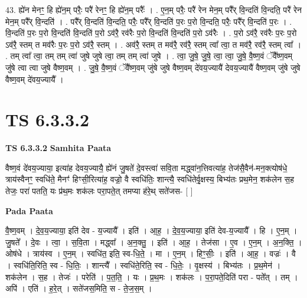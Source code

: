 \documentclass[17pt]{extarticle}
\begin{document}
43. ह्ये॑न मेनꣳ॒॒ हि ह्ये॑न॒म् परैः॒ परै॑ रेनꣳ॒॒ हि ह्ये॑न॒म् परैः᳚ । . ए॒न॒म् परैः॒ परै॑ रेन मेन॒म् परै᳚र् वि॒न्दति॑ वि॒न्दति॒ परै॑ रेन मेन॒म् परै᳚र् वि॒न्दति॑ । . परै᳚र् वि॒न्दति॑ वि॒न्दति॒ परैः॒ परै᳚र् वि॒न्दति॑ प॒रः प॒रो वि॒न्दति॒ परैः॒ परै᳚र् वि॒न्दति॑ प॒रः । . वि॒न्दति॑ प॒रः प॒रो वि॒न्दति॑ वि॒न्दति॑ प॒रो ऽव॑रै॒ रव॑रैः प॒रो वि॒न्दति॑ वि॒न्दति॑ प॒रो ऽव॑रैः । . प॒रो ऽव॑रै॒ रव॑रैः प॒रः प॒रो ऽव॑रै॒ स्तम् त मव॑रैः प॒रः प॒रो ऽव॑रै॒ स्तम् । . अव॑रै॒ स्तम् त मव॑रै॒ रव॑रै॒ स्तम् त्वा᳚ त्वा॒ त मव॑रै॒ रव॑रै॒ स्तम् त्वा᳚ । . तम् त्वा᳚ त्वा॒ तम् तम् त्वा॑ जुषे जुषे त्वा॒ तम् तम् त्वा॑ जुषे । . त्वा॒ जु॒षे॒ जु॒षे॒ त्वा॒ त्वा॒ जु॒षे॒ वै॒ष्ण॒वं ॅवै᳚ष्ण॒वम् जु॑षे त्वा त्वा जुषे वैष्ण॒वम् । . जु॒षे॒ वै॒ष्ण॒वं ॅवै᳚ष्ण॒वम् जु॑षे जुषे वैष्ण॒वम् दे॑वय॒ज्यायै॑ देवय॒ज्यायै॑ वैष्ण॒वम् जु॑षे जुषे वैष्ण॒वम् दे॑वय॒ज्यायै᳚ । \newline
\pagebreak
{}

\section{ TS 6.3.3.2 }

\textbf{TS 6.3.3.2 } \newline
\textbf{Samhita Paata} \newline

वैष्ण॒वं दे॑वय॒ज्याया॒ इत्या॑ह देवय॒ज्यायै॒ ह्ये॑नं जु॒षते॑ दे॒वस्त्वा॑ सवि॒ता मद्ध्वा॑न॒त्तिवत्या॑ह॒ तेज॑सै॒वैन॑-मन॒क्त्योष॑धे॒ त्राय॑स्वैनꣳ॒॒ स्वधि॑ते॒ मैनꣳ॑ हिꣳसी॒रित्या॑ह॒ वज्रो॒ वै स्वधि॑तिः॒ शान्त्यै॒ स्वधि॑तेर्वृ॒क्षस्य॒ बिभ्य॑तः प्रथ॒मेन॒ शक॑लेन स॒ह तेजः॒ परा॑ पतति॒ यः प्र॑थ॒मः शक॑लः परा॒पते॒त् तमप्या ह॑रे॒थ् सते॑जस- [  ] \newline

\textbf{Pada Paata} \newline

वै॒ष्ण॒वम् । दे॒व॒य॒ज्याया॒ इति॑ देव - य॒ज्यायै᳚ । इति॑ । आ॒ह॒ । दे॒व॒य॒ज्याया॒ इति॑ देव-य॒ज्यायै᳚ । हि । ए॒न॒म् । जु॒षते᳚ । दे॒वः । त्वा॒ । स॒वि॒ता । मद्ध्वा᳚ । अ॒न॒क्तु॒ । इति॑ । आ॒ह॒ । तेज॑सा । ए॒व । ए॒न॒म् । अ॒न॒क्ति॒ । ओष॑धे । त्राय॑स्व । ए॒न॒म् । स्वधि॑त॒ इति॒ स्व-धि॒ते॒ । मा । ए॒न॒म् । हिꣳ॒॒सीः॒ । इति॑ । आ॒ह॒ । वज्रः॑ । वै । स्वधि॑ति॒रिति॒ स्व - धि॒तिः॒ । शान्त्यै᳚ । स्वधि॑ते॒रिति॒ स्व - धि॒तेः॒ । वृ॒क्षस्य॑ । बिभ्य॑तः । प्र॒थ॒मेन॑ । शक॑लेन । स॒ह । तेजः॑ । परेति॑ । प॒त॒ति॒ । यः । प्र॒थ॒मः । शक॑लः । प॒रा॒पते॒दिति॑ परा - पते᳚त् । तम् । अपि॑ । एति॑ । ह॒रे॒त् । सते॑जस॒मिति॒ स - ते॒ज॒स॒म् ।  \newline
\end{document}
